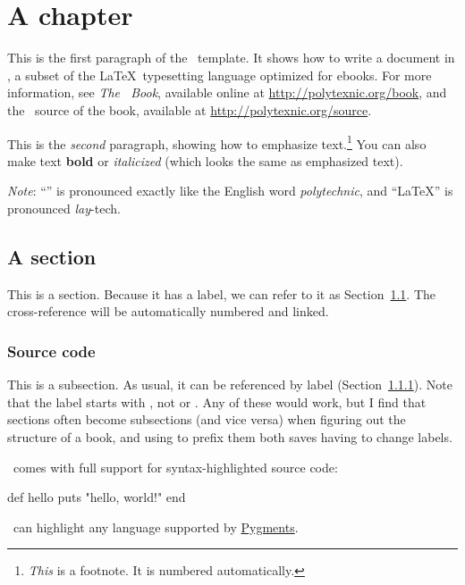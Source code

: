 \chapter{A chapter}
\label{cha:a_chapter}

This is the first paragraph of the \PolyTeXnic\ template. It shows how to write a document in \PolyTeX, a subset of the \LaTeX\ typesetting language optimized for ebooks. For more information, see \emph{The \PolyTeXnic\ Book}, available online at \href{http://polytexnic.org/book}{http://polytexnic.org/book}, and the \PolyTeX\ source of the book, available at \href{http://polytexnic.org/source}{http://polytexnic.org/source}.

This is the \emph{second} paragraph, showing how to emphasize text.\footnote{\emph{This} is a footnote. It is numbered automatically.} You can also make text \textbf{bold} or \textit{italicized} (which looks the same as emphasized text).

\emph{Note}: ``\PolyTeXnic'' is pronounced exactly like the English word \emph{polytechnic}, and ``\LaTeX'' is pronounced \emph{lay}-tech.

\section{A section}
\label{sec:a_section}

This is a section. Because it has a label, we can refer to it as Section~\ref{sec:a_section}. The cross-reference will be automatically numbered and linked.

\subsection{Source code}
\label{sec:source_code}

This is a subsection. As usual, it can be referenced by label (Section~\ref{sec:source_code}). Note that the label starts with , not  or . Any of these would work, but I find that sections often become subsections (and vice versa) when figuring out the structure of a book, and using  to prefix them both saves having to change labels.

\PolyTeXnic\ comes with full support for syntax-highlighted source code:
\begin{code}
def hello
  puts "hello, world!"
end
\end{code}
\noindent \PolyTeXnic\ can highlight any language supported by \href{http://pygments.org/languages/}{Pygments}.

